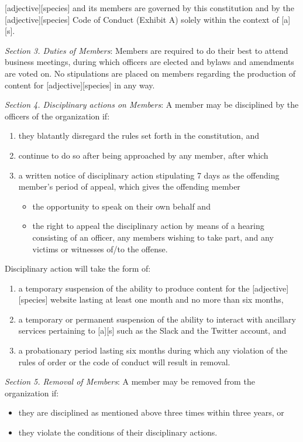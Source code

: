 \documentclass{article}
\begin{document}
[adjective][species] and its members are governed by this constitution and by the [adjective][species] Code of Conduct (Exhibit A) solely within the context of [a][s].

\emph{Section 3. Duties of Members}: Members are required to do their best to attend business meetings, during which officers are elected and bylaws and amendments are voted on.  No stipulations are placed on members regarding the production of content for [adjective][species] in any way.

\emph{Section 4. Disciplinary actions on Members}: A member may be disciplined by the officers of the organization if:
\begin{enumerate}
  \item they blatantly disregard the rules set forth in the constitution, and
  \item continue to do so after being approached by any member, after which
  \item a written notice of disciplinary action stipulating 7 days as the offending member's period of appeal, which gives the offending member
  \begin{itemize}
    \item the opportunity to speak on their own behalf and
    \item the right to appeal the disciplinary action by means of a hearing consisting of an officer, any members wishing to take part, and any victims or witnesses of/to the offense.
  \end{itemize}
\end{enumerate}

Disciplinary action will take the form of:
\begin{enumerate}
  \item a temporary suspension of the ability to produce content for the [adjective][species] website lasting at least one month and no more than six months,
  \item a temporary or permanent suspension of the ability to interact with ancillary services pertaining to [a][s] such as the Slack and the Twitter account, and
  \item a probationary period lasting six months during which any violation of the rules of order or the code of conduct will result in removal.
\end{enumerate}

\emph{Section 5. Removal of Members}: A member may be removed from the organization if:
\begin{itemize}
  \item they are disciplined as mentioned above three times within three years, or
  \item they violate the conditions of their disciplinary actions.
\end{itemize}
\end{document}
